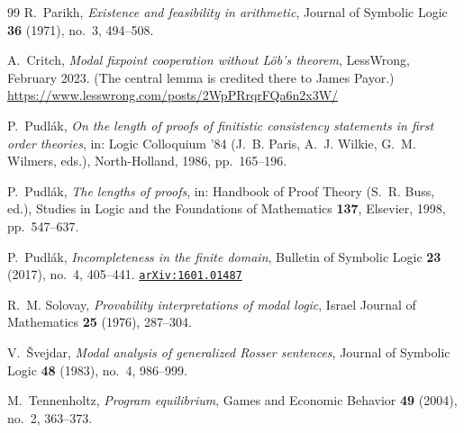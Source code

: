 \documentclass[11pt]{amsart}
\newcommand{\arxiv}[1]{\href{https://arxiv.org/abs/#1}{\texttt{arXiv:#1}}}
\theoremstyle{plain}
\theoremstyle{definition}
\begin{document}
\begin{thebibliography}{99}
R.~Parikh,
\emph{Existence and feasibility in arithmetic},
Journal of Symbolic Logic \textbf{36} (1971), no.~3, 494--508.

A.~Critch,
\emph{Modal fixpoint cooperation without L\"ob's theorem},
LessWrong, February 2023. (The central lemma is credited there to James Payor.)
\url{https://www.lesswrong.com/posts/2WpPRrqrFQa6n2x3W/}

P.~Pudl\'ak,
\emph{On the length of proofs of finitistic consistency statements in first order theories},
in: Logic Colloquium '84 (J.~B. Paris, A.~J. Wilkie, G.~M. Wilmers, eds.), North-Holland, 1986, pp.~165--196.

P.~Pudl\'ak,
\emph{The lengths of proofs},
in: Handbook of Proof Theory (S.~R. Buss, ed.), Studies in Logic and the Foundations of Mathematics \textbf{137}, Elsevier, 1998, pp.~547--637.

P.~Pudl\'ak,
\emph{Incompleteness in the finite domain},
Bulletin of Symbolic Logic \textbf{23} (2017), no.~4, 405--441. \arxiv{1601.01487}

R.~M. Solovay,
\emph{Provability interpretations of modal logic},
Israel Journal of Mathematics \textbf{25} (1976), 287--304.

V.~\v{S}vejdar,
\emph{Modal analysis of generalized Rosser sentences},
Journal of Symbolic Logic \textbf{48} (1983), no.~4, 986--999.

M.~Tennenholtz,
\emph{Program equilibrium},
Games and Economic Behavior \textbf{49} (2004), no.~2, 363--373.

\end{thebibliography}
\end{document}

